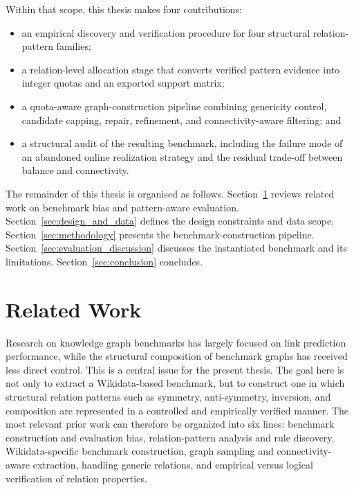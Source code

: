 \documentclass[12pt,a4paper]{article}
\begin{document}
Within that scope, this thesis makes four contributions:
\begin{itemize}
    \item an empirical discovery and verification procedure for four structural relation-pattern families;
    \item a relation-level allocation stage that converts verified pattern evidence into integer quotas and an exported support matrix;
    \item a quota-aware graph-construction pipeline combining genericity control, candidate capping, repair, refinement, and connectivity-aware filtering; and
    \item a structural audit of the resulting benchmark, including the failure mode of an abandoned online realization strategy and the residual trade-off between balance and connectivity.
\end{itemize}

The remainder of this thesis is organised as follows. Section~\ref{sec:related-work} reviews related work on benchmark bias and pattern-aware evaluation. Section~\ref{sec:design_and_data} defines the design constraints and data scope. Section~\ref{sec:methodology} presents the benchmark-construction pipeline. Section~\ref{sec:evaluation_discussion} discusses the instantiated benchmark and its limitations. Section~\ref{sec:conclusion} concludes.


\section{Related Work}
\label{sec:related-work}

Research on knowledge graph benchmarks has largely focused on link prediction performance, while the structural composition of benchmark graphs has received less direct control. This is a central issue for the present thesis. The goal here is not only to extract a Wikidata-based benchmark, but to construct one in which structural relation patterns such as symmetry, anti-symmetry, inversion, and composition are represented in a controlled and empirically verified manner. The most relevant prior work can therefore be organized into six lines: benchmark construction and evaluation bias, relation-pattern analysis and rule discovery, Wikidata-specific benchmark construction, graph sampling and connectivity-aware extraction, handling generic relations, and empirical versus logical verification of relation properties.
\end{document}
